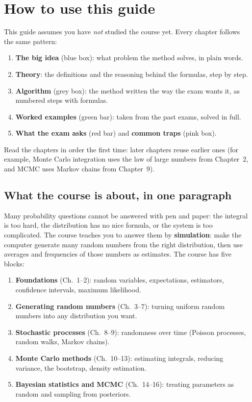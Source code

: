 \section*{How to use this guide}

This guide assumes you have \emph{not} studied the course yet. Every chapter follows the same pattern:

\begin{enumerate}
  \item \textbf{The big idea} (blue box): what problem the method solves, in plain words.
  \item \textbf{Theory}: the definitions and the reasoning behind the formulas, step by step.
  \item \textbf{Algorithm} (grey box): the method written the way the exam wants it, as numbered steps with formulas.
  \item \textbf{Worked examples} (green bar): taken from the past exams, solved in full.
  \item \textbf{What the exam asks} (red bar) and \textbf{common traps} (pink box).
\end{enumerate}

Read the chapters in order the first time: later chapters reuse earlier ones (for example, Monte Carlo integration uses the law of large numbers from Chapter~2, and MCMC uses Markov chains from Chapter~9).

\subsection*{What the course is about, in one paragraph}
Many probability questions cannot be answered with pen and paper: the integral is too hard, the distribution has no nice formula, or the system is too complicated. The course teaches you to answer them by \textbf{simulation}: make the computer generate many random numbers from the right distribution, then use averages and frequencies of those numbers as estimates. The course has five blocks:
\begin{enumerate}
  \item \textbf{Foundations} (Ch.~1--2): random variables, expectations, estimators, confidence intervals, maximum likelihood.
  \item \textbf{Generating random numbers} (Ch.~3--7): turning uniform random numbers into any distribution you want.
  \item \textbf{Stochastic processes} (Ch.~8--9): randomness over time (Poisson processes, random walks, Markov chains).
  \item \textbf{Monte Carlo methods} (Ch.~10--13): estimating integrals, reducing variance, the bootstrap, density estimation.
  \item \textbf{Bayesian statistics and MCMC} (Ch.~14--16): treating parameters as random and sampling from posteriors.
\end{enumerate}

